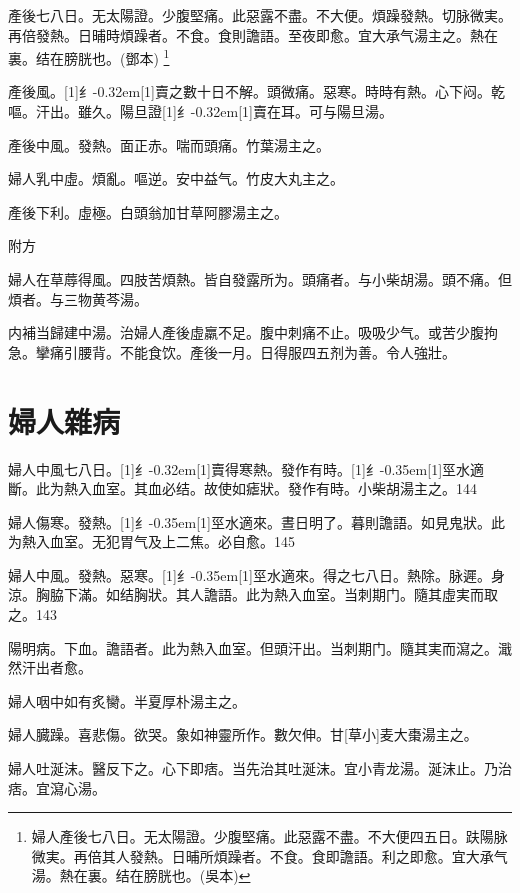 \documentclass[11pt,oneside,b5paper]{ctexbook}
\begin{document}
\begin{flushleft}
產後七八日。无太陽證。少腹堅痛。此惡露不盡。不大便。煩躁發熱。切脉微実。再倍發熱。日晡時煩躁者。不食。食則譫語。至夜即愈。宜大承气湯主之。熱在裏。结在膀胱也。(鄧本)
\footnote{婦人產後七八日。无太陽證。少腹堅痛。此惡露不盡。不大便四五日。趺陽脉微実。再倍其人發熱。日晡所煩躁者。不食。食即譫語。利之即愈。宜大承气湯。熱在裏。结在膀胱也。(吳本)}

產後風。{\hbox{\scalebox{0.6}[1]{纟}\kern-0.32em\scalebox{0.7}[1]{賣}}}之數十日不解。頭微痛。惡寒。時時有熱。心下闷。乾嘔。汗出。雖久。陽旦證{\hbox{\scalebox{0.6}[1]{纟}\kern-0.32em\scalebox{0.7}[1]{賣}}}在耳。可与陽旦湯。

產後中風。發熱。面正赤。喘而頭痛。竹葉湯主之。

婦人乳中虛。煩亂。嘔逆。安中益气。竹皮大丸主之。

產後下利。虛極。白頭翁加甘草阿膠湯主之。

附方

婦人在草蓐得風。四肢苦煩熱。皆自發露所为。頭痛者。与小柴胡湯。頭不痛。但煩者。与三物黄芩湯。

内補当歸建中湯。治婦人產後虛羸不足。腹中刺痛不止。吸吸少气。或苦少腹拘急。攣痛引腰背。不能食饮。產後一月。日得服四五剂为善。令人強壯。

\chapter{婦人雜病}

婦人中風七八日。{\hbox{\scalebox{0.6}[1]{纟}\kern-0.32em\scalebox{0.7}[1]{賣}}}得寒熱。發作有時。{\hbox{\scalebox{0.68}[1]{纟}\kern-0.35em\scalebox{0.64}[1]{巠}}}水適斷。此为熱入血室。其血必结。故使如瘧狀。發作有時。小柴胡湯主之。144

婦人傷寒。發熱。{\hbox{\scalebox{0.68}[1]{纟}\kern-0.35em\scalebox{0.64}[1]{巠}}}水適來。晝日明了。暮則譫語。如見鬼狀。此为熱入血室。无犯胃气及上二焦。必自愈。145

婦人中風。發熱。惡寒。{\hbox{\scalebox{0.68}[1]{纟}\kern-0.35em\scalebox{0.64}[1]{巠}}}水適來。得之七八日。熱除。脉遲。身涼。胸脇下滿。如结胸狀。其人譫語。此为熱入血室。当刺期门。隨其虛実而取之。143

陽明病。下血。譫語者。此为熱入血室。但頭汗出。当刺期门。隨其実而瀉之。濈然汗出者愈。

婦人咽中如有炙臠。半夏厚朴湯主之。

婦人臓躁。喜悲傷。欲哭。象如神靈所作。數欠伸。甘[草小]麦大棗湯主之。

婦人吐涎沫。醫反下之。心下即痞。当先治其吐涎沫。宜小青龙湯。涎沫止。乃治痞。宜瀉心湯。


\end{flushleft}
\end{document}
